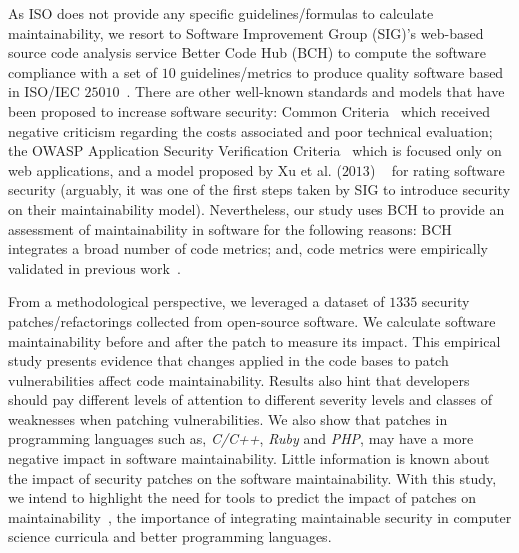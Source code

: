 \documentclass[smallextended]{svjour3}       %
\begin{document}
As ISO does not provide any specific guidelines/formulas to calculate 
maintainability, we resort to Software Improvement Group (SIG)'s web-based source 
code analysis service Better Code Hub (BCH) to compute the software compliance 
with a set of $10$ guidelines/metrics to produce quality software 
based in ISO/IEC $25010$~\cite{Visser:2016:OREILLY}. 
There are other well-known standards and models that have been proposed
to increase software security: Common Criteria~\cite{common:2009} which received
negative criticism regarding the costs associated and poor technical evaluation;
the OWASP Application Security Verification Criteria~\cite{oswap:2009} which is
focused only on web applications, and a model proposed by Xu et al. ($2013$)
~\cite{6616351} for rating software security (arguably, it was one of the
first steps taken by SIG to introduce security on their maintainability model). 
Nevertheless, our study uses BCH to provide an assessment of maintainability in 
software for the following reasons: BCH integrates a broad number of code metrics; and, 
code metrics were empirically validated in previous work~\cite{Bijlsma:2012:FIR:2317098.2317124,8530041,8919169,8785997}.

From a methodological 
perspective, we leveraged a dataset of $1335$ security patches/refactorings collected from open-source 
software. We calculate software maintainability before and after the patch to measure its 
impact. This empirical study presents evidence that changes 
applied in the code bases to patch vulnerabilities affect code maintainability.
Results also hint that developers should pay different levels of attention 
to different severity levels and classes of weaknesses when patching vulnerabilities. We also
show that patches in programming languages such as, \emph{C/C++}, \emph{Ruby} and \emph{PHP}, 
may have a more negative impact in software maintainability.
Little information is known about the impact of security patches on the software
maintainability. With this study, 
we intend to highlight the need for tools to predict the impact of patches on 
maintainability~\cite{4724577}, the importance of integrating
maintainable security in computer science curricula and better programming languages.
\end{document}
